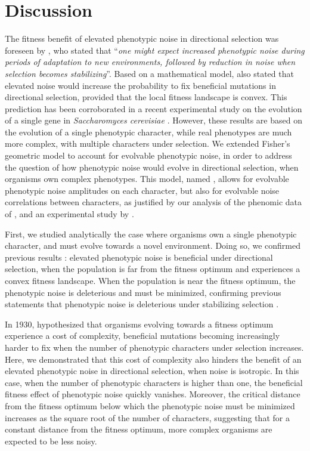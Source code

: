 
\section{Discussion}

The fitness benefit of elevated phenotypic noise in directional selection was foreseen by \cite{eldar-and-elowitz-2010}, who stated that ``\textit{one might expect increased phenotypic noise during periods of adaptation to new environments, followed by reduction in noise when selection becomes stabilizing}''. Based on a mathematical model, \cite{zhang-et-al-2009} also stated that elevated noise would increase the probability to fix beneficial mutations in directional selection, provided that the local fitness landscape is convex. This prediction has been corroborated in a recent experimental study on the evolution of a single gene in \textit{Saccharomyces cerevisiae} \citep{bodi-et-al-2017}. However, these results are based on the evolution of a single phenotypic character, while real phenotypes are much more complex, with multiple characters under selection. We extended Fisher's geometric model \citep{fisher-1930} to account for evolvable phenotypic noise, in order to address the question of how phenotypic noise would evolve in directional selection, when organisms own complex phenotypes. This model, named {\sigmaFGM}, allows for evolvable phenotypic noise amplitudes on each character, but also for evolvable noise correlations between characters, as justified by our analysis of the phenomic data of \cite{yvert-et-al-2013}, and an experimental study by \cite{cressler-et-al-2017}.

First, we studied analytically the case where organisms own a single phenotypic character, and must evolve towards a novel environment. Doing so, we confirmed previous results \citep{zhang-et-al-2009,eldar-and-elowitz-2010,bodi-et-al-2017}: elevated phenotypic noise is beneficial under directional selection, when the population is far from the fitness optimum and experiences a convex fitness landscape. When the population is near the fitness optimum, the phenotypic noise is deleterious and must be minimized, confirming previous statements that phenotypic noise is deleterious under stabilizing selection \citep{mineta-et-al-2015,keren-et-al-2016}.

In 1930, \cite{fisher-1930} hypothesized that organisms evolving towards a fitness optimum experience a cost of complexity, beneficial mutations becoming increasingly harder to fix when the number of phenotypic characters under selection increases. Here, we demonstrated that this cost of complexity also hinders the benefit of an elevated phenotypic noise in directional selection, when noise is isotropic. In this case, when the number of phenotypic characters is higher than one, the beneficial fitness effect of phenotypic noise quickly vanishes. Moreover, the critical distance from the fitness optimum below which the phenotypic noise must be minimized increases as the square root of the number of characters, suggesting that for a constant distance from the fitness optimum, more complex organisms are expected to be less noisy.

